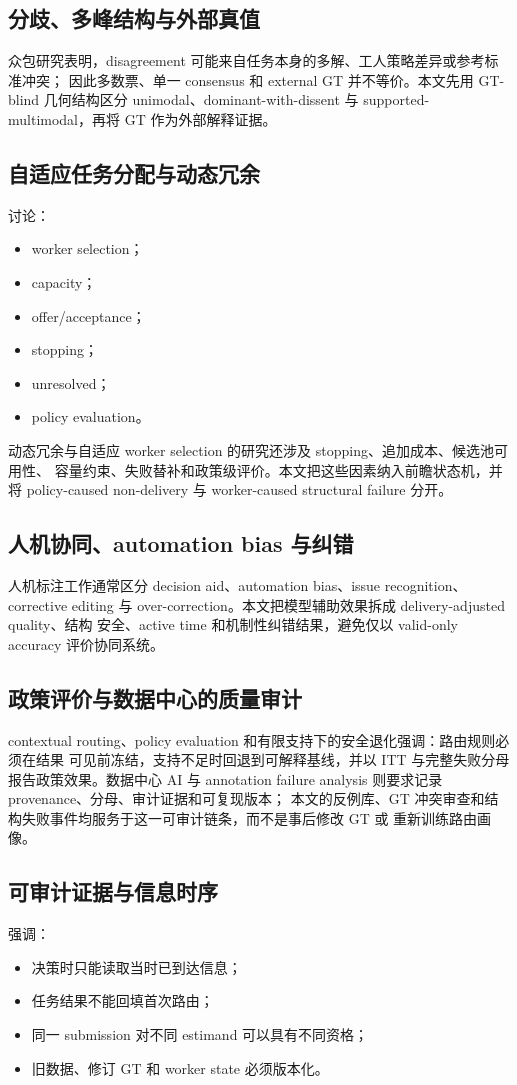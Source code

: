 \subsection{分歧、多峰结构与外部真值}

众包研究表明，disagreement 可能来自任务本身的多解、工人策略差异或参考标准冲突；
因此多数票、单一 consensus 和 external GT 并不等价。本文先用 GT-blind 几何结构区分
unimodal、dominant-with-dissent 与 supported-multimodal，再将 GT 作为外部解释证据。

\subsection{自适应任务分配与动态冗余}

讨论：

\begin{itemize}
  \item worker selection；
  \item capacity；
  \item offer/acceptance；
  \item stopping；
  \item unresolved；
  \item policy evaluation。
\end{itemize}

动态冗余与自适应 worker selection 的研究还涉及 stopping、追加成本、候选池可用性、
容量约束、失败替补和政策级评价。本文把这些因素纳入前瞻状态机，并将 policy-caused
non-delivery 与 worker-caused structural failure 分开。

\subsection{人机协同、automation bias 与纠错}

人机标注工作通常区分 decision aid、automation bias、issue recognition、corrective
editing 与 over-correction。本文把模型辅助效果拆成 delivery-adjusted quality、结构
安全、active time 和机制性纠错结果，避免仅以 valid-only accuracy 评价协同系统。

\subsection{政策评价与数据中心的质量审计}

contextual routing、policy evaluation 和有限支持下的安全退化强调：路由规则必须在结果
可见前冻结，支持不足时回退到可解释基线，并以 ITT 与完整失败分母报告政策效果。数据中心
AI 与 annotation failure analysis 则要求记录 provenance、分母、审计证据和可复现版本；
本文的反例库、GT 冲突审查和结构失败事件均服务于这一可审计链条，而不是事后修改 GT 或
重新训练路由画像。

\subsection{可审计证据与信息时序}

强调：

\begin{itemize}
  \item 决策时只能读取当时已到达信息；
  \item 任务结果不能回填首次路由；
  \item 同一 submission 对不同 estimand 可以具有不同资格；
  \item 旧数据、修订 GT 和 worker state 必须版本化。
\end{itemize}
